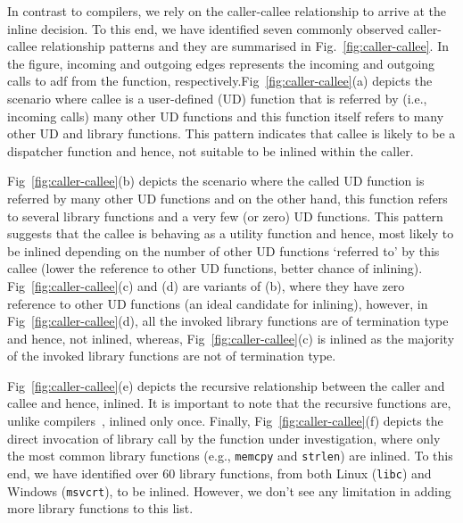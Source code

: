 In contrast to compilers, we rely on the caller-callee relationship to arrive at the inline decision. To this end, we have identified seven commonly observed caller-callee relationship patterns and they are summarised in Fig.~\ref{fig:caller-callee}. In the figure, incoming and outgoing edges represents the incoming and outgoing calls to adf from the function, respectively.Fig~\ref{fig:caller-callee}(a) depicts the scenario where callee is a user-defined (UD) function that is referred by (i.e., incoming calls) many other UD functions and this function itself refers to many other UD and library functions. This pattern indicates that callee is likely to be a dispatcher function  and hence, not suitable to be inlined within the caller.

Fig~\ref{fig:caller-callee}(b) depicts the scenario where the called UD function is referred by many other UD functions and on the other hand, this function refers to several library functions and a very few (or zero) UD functions. This pattern suggests that the callee is behaving as a utility function and hence, most likely to be inlined depending on the number of other UD functions `referred to' by this callee (lower the reference to other UD functions, better chance of inlining). Fig~\ref{fig:caller-callee}(c) and (d) are variants of (b), where they have zero reference to other UD functions (an ideal candidate for inlining), however, in Fig~\ref{fig:caller-callee}(d), all the invoked library functions are of termination type and hence, not inlined, whereas, Fig~\ref{fig:caller-callee}(c) is inlined as the majority of the invoked library functions are not of termination type. 

Fig~\ref{fig:caller-callee}(e) depicts the recursive relationship between the caller and callee and hence, inlined. It is important to note that the recursive functions are, unlike compilers~\cite{chang1992profile}, inlined only once. Finally, Fig~\ref{fig:caller-callee}(f) depicts the direct invocation of library call by the function under investigation, where only the most common library functions (e.g., \texttt{memcpy} and \texttt{strlen}) are inlined. To this end, we have identified over 60 library functions, from both Linux (\texttt{libc}) and Windows (\texttt{msvcrt}), to be inlined. However, we don't see any limitation in adding more library functions to this list. 

